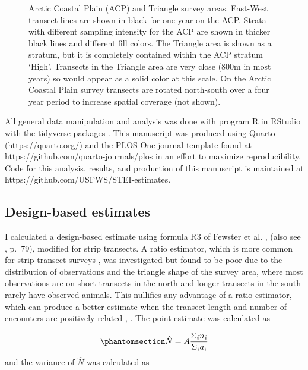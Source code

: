 \documentclass[
  10pt,
  letterpaper,
]{article}
\begin{document}
\begin{figure}

\caption{\label{fig-area}Arctic Coastal Plain (ACP) and Triangle survey
areas. East-West transect lines are shown in black for one year on the
ACP. Strata with different sampling intensity for the ACP are shown in
thicker black lines and different fill colors. The Triangle area is
shown as a stratum, but it is completely contained within the ACP
stratum `High'. Transects in the Triangle area are very close (800m in
most years) so would appear as a solid color at this scale. On the
Arctic Coastal Plain survey transects are rotated north-south over a
four year period to increase spatial coverage (not shown).}

\end{figure}%

All general data manipulation and analysis was done with program R
\citep{r-base} in RStudio \citep{RStudio2024} with the tidyverse
packages \citep{tidyverse}. This manuscript was produced using Quarto
(https://quarto.org/) and the PLOS One journal template found at
https://github.com/quarto-journals/plos in an effort to maximize
reproducibility. Code for this analysis, results, and production of this
manuscript is maintained at https://github.com/USFWS/STEI-estimates.

\subsection{Design-based estimates}\label{design-based-estimates}

I calculated a design-based estimate using formula R3 of Fewster et
al. \citep{fewster2009}, (also see \citep{buckland2001}, p.~79),
modified for strip transects. A ratio estimator, which is more common
for strip-transect surveys \citep{cochran1977} \citep{williams2002}
\citep{thompson2012}, was investigated but found to be poor due to the
distribution of observations and the triangle shape of the survey area,
where most observations are on short transects in the north and longer
transects in the south rarely have observed animals. This nullifies any
advantage of a ratio estimator, which can produce a better estimate when
the transect length and number of encounters are positively related
\citep{cochran1977}, \citep{thompson2012}. The point estimate was
calculated as

\begin{equation}\phantomsection\label{eq-1}{\hat N = A \frac{\Sigma_i n_i}{\Sigma_i a_i}}\end{equation}
and the variance of \(\hat N\) was calculated as
\end{document}
